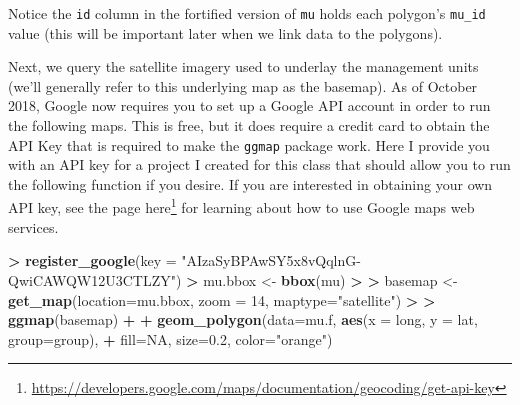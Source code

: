 \documentclass[]{krantz}
\makeatletter
\newenvironment{Shaded}{\begin{snugshade}}{\end{snugshade}}
\newcommand{\DataTypeTok}[1]{\textcolor[rgb]{0.27,0.27,0.27}{#1}}
\newcommand{\DecValTok}[1]{\textcolor[rgb]{0.06,0.06,0.06}{#1}}
\newcommand{\ErrorTok}[1]{\textcolor[rgb]{0.14,0.14,0.14}{\textbf{#1}}}
\newcommand{\FloatTok}[1]{\textcolor[rgb]{0.06,0.06,0.06}{#1}}
\newcommand{\KeywordTok}[1]{\textcolor[rgb]{0.27,0.27,0.27}{\textbf{#1}}}
\newcommand{\NormalTok}[1]{#1}
\newcommand{\OperatorTok}[1]{\textcolor[rgb]{0.43,0.43,0.43}{\textbf{#1}}}
\newcommand{\OtherTok}[1]{\textcolor[rgb]{0.37,0.37,0.37}{#1}}
\newcommand{\StringTok}[1]{\textcolor[rgb]{0.5,0.5,0.5}{#1}}
\renewcommand{\href}[2]{#2\footnote{\url{#1}}}
\newenvironment{kframe}{%
\medskip{}
\setlength{\fboxsep}{.8em}
 \def\at@end@of@kframe{}%
 \ifinner\ifhmode%
  \def\at@end@of@kframe{\end{minipage}}%
  \begin{minipage}{\columnwidth}%
 \fi\fi%
 \def\FrameCommand##1{\hskip\@totalleftmargin \hskip-\fboxsep
 \colorbox{shadecolor}{##1}\hskip-\fboxsep
     \hskip-\linewidth \hskip-\@totalleftmargin \hskip\columnwidth}%
 \MakeFramed {\advance\hsize-\width
   \@totalleftmargin\z@ \linewidth\hsize
   \@setminipage}}%
 {\par\unskip\endMakeFramed%
 \at@end@of@kframe}
\renewenvironment{Shaded}{\begin{kframe}}{\end{kframe}}
\makeatother
\begin{document}
Notice the \texttt{id} column in the fortified version of \texttt{mu} holds each polygon's \texttt{mu\_id} value (this will be important later when we link data to the polygons).

Next, we query the satellite imagery used to underlay the management units (we'll generally refer to this underlying map as the basemap). As of October 2018, Google now requires you to set up a Google API account in order to run the following maps. This is free, but it does require a credit card to obtain the API Key that is required to make the \texttt{ggmap} package work. Here I provide you with an API key for a project I created for this class that should allow you to run the following function if you desire. If you are interested in obtaining your own API key, see the page \href{https://developers.google.com/maps/documentation/geocoding/get-api-key}{here} for learning about how to use Google maps web services.

\begin{Shaded}
\begin{Highlighting}[]
\OperatorTok{>}\StringTok{ }\KeywordTok{register_google}\NormalTok{(}\DataTypeTok{key =} \StringTok{"AIzaSyBPAwSY5x8vQqlnG-QwiCAWQW12U3CTLZY"}\NormalTok{)}
\OperatorTok{>}\StringTok{ }\NormalTok{mu.bbox <-}\StringTok{ }\KeywordTok{bbox}\NormalTok{(mu)}
\OperatorTok{>}\StringTok{ }
\ErrorTok{>}\StringTok{ }\NormalTok{basemap <-}\StringTok{ }\KeywordTok{get_map}\NormalTok{(}\DataTypeTok{location=}\NormalTok{mu.bbox, }\DataTypeTok{zoom =} \DecValTok{14}\NormalTok{, }\DataTypeTok{maptype=}\StringTok{"satellite"}\NormalTok{)}
\OperatorTok{>}\StringTok{ }
\ErrorTok{>}\StringTok{ }\KeywordTok{ggmap}\NormalTok{(basemap) }\OperatorTok{+}
\OperatorTok{+}\StringTok{     }\KeywordTok{geom_polygon}\NormalTok{(}\DataTypeTok{data=}\NormalTok{mu.f, }\KeywordTok{aes}\NormalTok{(}\DataTypeTok{x =}\NormalTok{ long, }\DataTypeTok{y =}\NormalTok{ lat, }\DataTypeTok{group=}\NormalTok{group), }
\OperatorTok{+}\StringTok{                  }\DataTypeTok{fill=}\OtherTok{NA}\NormalTok{, }\DataTypeTok{size=}\FloatTok{0.2}\NormalTok{, }\DataTypeTok{color=}\StringTok{"orange"}\NormalTok{)}
\end{Highlighting}
\end{Shaded}
\end{document}
